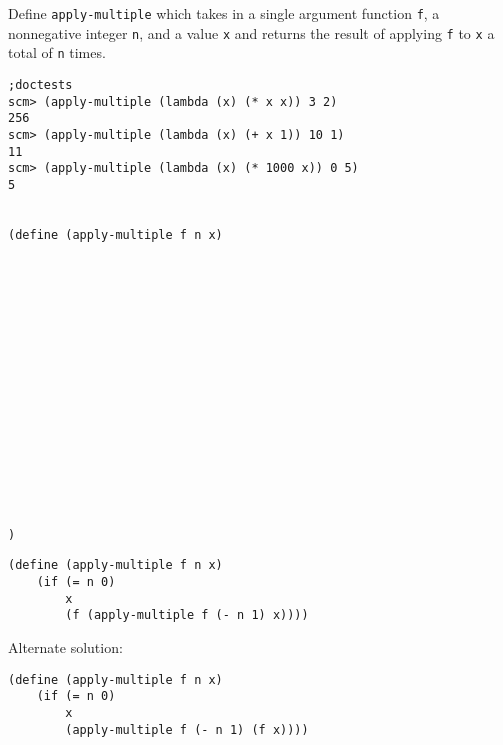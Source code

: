 \begin{blocksection}
\question Define \lstinline{apply-multiple} which takes in a single argument function \lstinline{f}, 
a nonnegative integer \lstinline{n}, and a value \lstinline{x} and returns the result of applying 
\lstinline{f} to \lstinline{x} a total of \lstinline{n} times.

\begin{lstlisting}
;doctests
scm> (apply-multiple (lambda (x) (* x x)) 3 2)
256
scm> (apply-multiple (lambda (x) (+ x 1)) 10 1)
11
scm> (apply-multiple (lambda (x) (* 1000 x)) 0 5)
5


(define (apply-multiple f n x)

















)
\end{lstlisting}
\begin{solution}
\begin{lstlisting}
(define (apply-multiple f n x)
    (if (= n 0)
        x
        (f (apply-multiple f (- n 1) x))))
\end{lstlisting}

Alternate solution:

\begin{lstlisting}
(define (apply-multiple f n x)
    (if (= n 0)
        x
        (apply-multiple f (- n 1) (f x))))
\end{lstlisting}
\end{solution}
\end{blocksection}